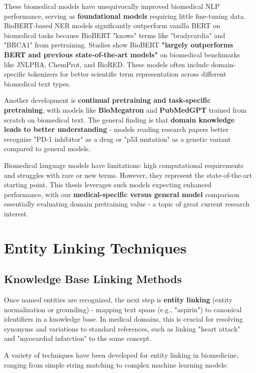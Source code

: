 These biomedical models have unequivocally improved biomedical NLP performance, serving as \textbf{foundational models} requiring little fine-tuning data. BioBERT-based NER models significantly outperform vanilla BERT on biomedical tasks because BioBERT "knows" terms like "bradycardia" and "BRCA1" from pretraining. Studies show BioBERT \textbf{"largely outperforms BERT and previous state-of-the-art models"} on biomedical benchmarks like JNLPBA, ChemProt, and BioRED. These models often include domain-specific tokenizers for better scientific term representation across different biomedical text types.

Another development is \textbf{continual pretraining and task-specific pretraining}, with models like \textbf{BioMegatron} and \textbf{PubMedGPT} \parencite{bolton2024biomedlm27bparameterlanguage} trained from scratch on biomedical text. The general finding is that \textbf{domain knowledge leads to better understanding} - models reading research papers better recognize "PD-1 inhibitor" as a drug or "p53 mutation" as a genetic variant compared to general models.

Biomedical language models have limitations: high computational requirements and struggles with rare or new terms. However, they represent the state-of-the-art starting point. This thesis leverages such models expecting enhanced performance, with our \textbf{medical-specific versus general model} comparison essentially evaluating domain pretraining value - a topic of great current research interest.

\section{Entity Linking Techniques}

\subsection{Knowledge Base Linking Methods}

Once named entities are recognized, the next step is \textbf{entity linking} (entity normalization or grounding) - mapping text spans (e.g., "aspirin") to canonical identifiers in a knowledge base. In medical domains, this is crucial for resolving synonyms and variations to standard references, such as linking "heart attack" and "myocardial infarction" to the same concept.

A variety of techniques have been developed for entity linking in biomedicine, ranging from simple string matching to complex machine learning models:

